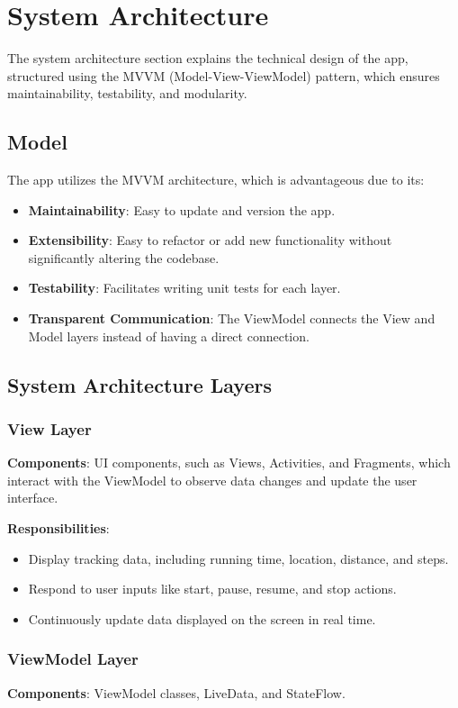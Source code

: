 \section{\bfseries System Architecture}
\Large
The system architecture section explains the technical design of the app, structured using the MVVM (Model-View-ViewModel) pattern, which ensures maintainability, testability, and modularity.

\subsection{Model}
The app utilizes the MVVM architecture, which is advantageous due to its:
\begin{itemize}
    \item \textbf{Maintainability}: Easy to update and version the app.
    \item \textbf{Extensibility}: Easy to refactor or add new functionality without significantly altering the codebase.
    \item \textbf{Testability}: Facilitates writing unit tests for each layer.
    \item \textbf{Transparent Communication}: The ViewModel connects the View and Model layers instead of having a direct connection.
\end{itemize}

\subsection{System Architecture Layers}

\subsubsection{View Layer}
\textbf{Components}: UI components, such as Views, Activities, and Fragments, which interact with the ViewModel to observe data changes and update the user interface.

\textbf{Responsibilities}:
\begin{itemize}
    \item Display tracking data, including running time, location, distance, and steps.
    \item Respond to user inputs like start, pause, resume, and stop actions.
    \item Continuously update data displayed on the screen in real time.
\end{itemize}

\subsubsection{ViewModel Layer}
\textbf{Components}: ViewModel classes, LiveData, and StateFlow.

